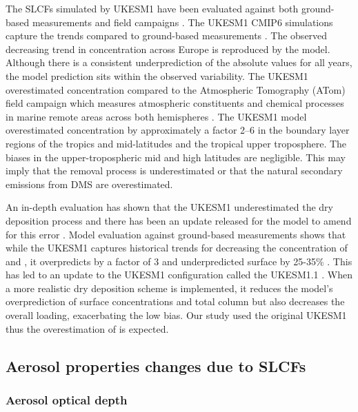 The SLCFs simulated by UKESM1 have been evaluated against both ground-based measurements and field campaigns \citep[e.g.][]{griffithsTroposphericOzoneCMIP62021, russoSeasonalInterannualDecadal2023}. The UKESM1 CMIP6 simulations capture the  trends compared to ground-based measurements \citep{mulcahyDescriptionEvaluationAerosol2020}. The observed decreasing trend in  concentration across Europe is reproduced by the model. Although there is a consistent underprediction of the absolute values for all years, the model prediction sits within the observed variability. The UKESM1 overestimated  concentration compared to the Atmospheric Tomography (ATom) field campaign which measures atmospheric constituents and chemical processes in marine remote areas across both hemispheres \citep{ranjithkumarConstraintsGlobalAerosol2021}. The UKESM1 model overestimated  concentration by approximately a factor 2–6 in the boundary layer regions of the tropics and mid-latitudes and the tropical upper troposphere. The biases in the upper-tropospheric mid and high latitudes are negligible. This may imply that the  removal process is underestimated or that the natural secondary emissions from DMS are overestimated.  

An in-depth evaluation has shown that the UKESM1 underestimated the dry deposition process and there has been an update released for the model to amend for this error \citep{hardacreEvaluationSO2SO422021}. Model evaluation against ground-based measurements shows that while the UKESM1 captures historical trends for decreasing the concentration of  and , it overpredicts  by a factor of 3 and underpredicted surface  by 25-35\% \citep{hardacreEvaluationSO2SO422021}. This has led to an update to the UKESM1 configuration called the UKESM1.1 \citep{mulcahyUKESM11DevelopmentEvaluation2023}. When a more realistic dry deposition scheme is implemented, it reduces the model’s overprediction of surface  concentrations and total column  but also decreases the overall  loading, exacerbating the low bias.  Our study used the original UKESM1 thus the overestimation of  is expected.


\subsection{Aerosol properties changes due to SLCFs}

\subsubsection{Aerosol optical depth}

